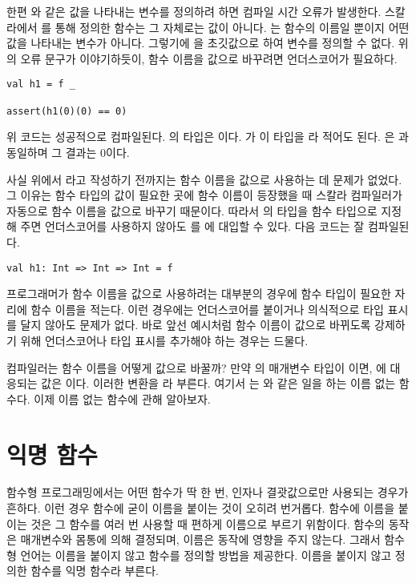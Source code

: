 한편 와 같은 값을 나타내는 변수를 정의하려 하면 컴파일 시간 오류가
발생한다. 스칼라에서 를 통해 정의한 함수는 그 자체로는 값이 아니다.
는 함수의 이름일 뿐이지 어떤 값을 나타내는 변수가 아니다. 그렇기에
을 초깃값으로 하여 변수를 정의할 수 없다. 위의 오류 문구가 이야기하듯이,
함수 이름을 값으로 바꾸려면 언더스코어가 필요하다.

\begin{verbatim}
val h1 = f _

assert(h1(0)(0) == 0)
\end{verbatim}

위 코드는 성공적으로 컴파일된다. 의 타입은 이다. \code{=>}가  이 타입을
라 적어도 된다. 은 과
동일하며 그 결과는 0이다.

사실 위에서 라고 작성하기 전까지는 함수 이름을 값으로 사용하는
데 문제가 없었다. 그 이유는 함수 타입의 값이 필요한 곳에 함수 이름이 등장했을 때
스칼라 컴파일러가 자동으로 함수 이름을 값으로 바꾸기 때문이다. 따라서
의 타입을 함수 타입으로 지정해 주면 언더스코어를 사용하지 않아도
를 에 대입할 수 있다. 다음 코드는 잘 컴파일된다.

\begin{verbatim}
val h1: Int => Int => Int = f
\end{verbatim}

프로그래머가 함수 이름을 값으로 사용하려는 대부분의 경우에 함수 타입이 필요한
자리에 함수 이름을 적는다. 이런 경우에는 언더스코어를 붙이거나 의식적으로 타입
표시를 달지 않아도 문제가 없다. 바로 앞선 예시처럼 함수 이름이 값으로 바뀌도록
강제하기 위해 언더스코어나 타입 표시를 추가해야 하는 경우는 드물다.

컴파일러는 함수 이름을 어떻게 값으로 바꿀까? 만약 의 매개변수 타입이
이면, 에 대응되는 값은 이다. 이러한
변환을 라 부른다. 여기서 는 와
같은 일을 하는 이름 없는 함수다. 이제 이름 없는 함수에 관해 알아보자.

\section{익명 함수}

함수형 프로그래밍에서는 어떤 함수가 딱 한 번, 인자나 결괏값으로만 사용되는
경우가 흔하다. 이런 경우 함수에 굳이 이름을 붙이는 것이 오히려 번거롭다. 함수에
이름을 붙이는 것은 그 함수를 여러 번 사용할 때 편하게 이름으로 부르기 위함이다.
함수의 동작은 매개변수와 몸통에 의해 결정되며, 이름은 동작에 영향을 주지 않는다.
그래서 함수형 언어는 이름을 붙이지 않고 함수를 정의할 방법을 제공한다. 이름을
붙이지 않고 정의한 함수를 익명 함수라 부른다.

